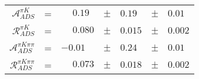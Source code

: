 \begin{center}
\begin{tabular}{rclclcl}
$\mathcal{A}_{ADS}^{\pi K}$ &= & $\phantom{+}0.19$ & $\pm$ & $0.19$ & $\pm$ & $0.01$ \\
$\mathcal{R}_{ADS}^{\pi K}$ &= & $\phantom{+}0.080$ & $\pm$ & $0.015$ & $\pm$ & $0.002$ \\
$\mathcal{A}_{ADS}^{\pi K\pi\pi}$ &= & $-0.01$ & $\pm$ & $0.24$ & $\pm$ & $0.01$ \\
$\mathcal{R}_{ADS}^{\pi K\pi\pi}$ &= & $\phantom{+}0.073$ & $\pm$ & $0.018$ & $\pm$ & $0.002$ \\
\end{tabular}
\end{center}
